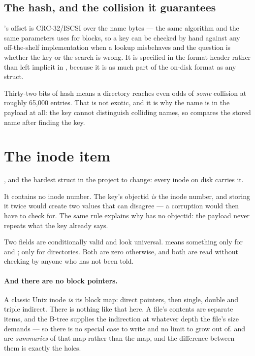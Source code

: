 \subsection{The hash, and the collision it guarantees}

's offset is CRC-32/ISCSI over the name bytes --- the same
algorithm and the same parameters  uses for blocks, so a
key can be checked by hand against any off-the-shelf implementation when a
lookup misbehaves and the question is whether the key or the search is wrong.
It is specified in the format header rather than left implicit in
, because it is as much part of the on-disk format as any
struct.

Thirty-two bits of hash means a directory reaches even odds of \emph{some}
collision at roughly 65{,}000 entries. That is not exotic, and it is why the
name is in the payload at all: the key cannot distinguish colliding names, so
 compares the stored name after finding the key.


\section{The inode item}

, and the hardest struct in the project to change: every inode on
disk carries it.

It contains no inode number. The key's objectid \emph{is} the inode number, and
storing it twice would create two values that can disagree --- a corruption
 would then have to check for. The same rule explains why
 has no objectid: the payload never repeats what the
key already says.

Two fields are conditionally valid and look universal.  means
something only for  and ; 
only for directories. Both are zero otherwise, and both are read without
checking  by anyone who has not been told.

\paragraph{And there are no block pointers.} A classic Unix inode \emph{is} its
block map: direct pointers, then single, double and triple indirect. There is
nothing like that here. A file's contents are separate
 items, and the B-tree supplies the
indirection at whatever depth the file's size demands --- so there is no
special case to write and no limit to grow out of.  and
 are \emph{summaries} of that map rather than the map, and the
difference between them is exactly the holes.

